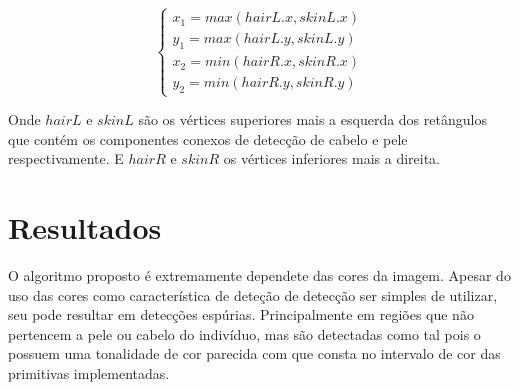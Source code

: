 \documentclass[journal,onecolumn]{IEEEtran}
\begin{document}
	 \begin{equation}
	 	\begin{cases}
	 	x_1 = max(hairL.x,skinL.x) \\
	 	y_1 = max(hairL.y,skinL.y) \\
	 	
	 	x_2 = min(hairR.x,skinR.x) \\
	 	y_2 = min(hairR.y,skinR.y) 
	 	\end{cases}
	 	\label{eq:intersectionPositions}
	 \end{equation}
	 
	Onde $hairL$ e $skinL$ são os vértices superiores mais a esquerda dos retângulos que contém os componentes conexos de detecção de cabelo e pele respectivamente.
	E $hairR$ e $skinR$ os vértices inferiores mais a direita.
	
	\section{Resultados}
	\label{sec:resultados}
	O algoritmo proposto é extremamente dependete das cores da imagem. 
	Apesar do uso das cores como característica de deteção de detecção ser simples de utilizar, seu pode resultar  em detecções espúrias.
	Principalmente em regiões que não pertencem a pele ou cabelo do indivíduo, mas são detectadas como tal pois o possuem uma tonalidade de cor parecida com que consta no intervalo de cor das primitivas implementadas.
\end{document}
